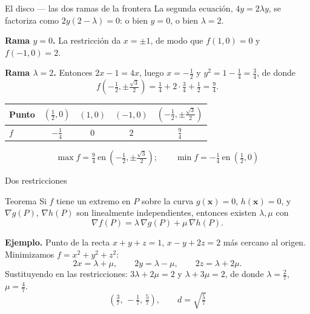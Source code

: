 \documentclass[11pt,aspectratio=169]{beamer}
\begin{document}
\begin{frame}{El disco --- las dos ramas de la frontera}
  La segunda ecuación, $4y=2\lambda y$, se factoriza como $2y(2-\lambda)=0$: o bien $y=0$, o bien $\lambda=2$.
  \par\pause\smallskip
  \textbf{Rama $y=0$.} La restricción da $x=\pm1$, de modo que
  $f(1,0)=0$ y $f(-1,0)=2$.
  \par\pause\smallskip
  \textbf{Rama $\lambda=2$.} Entonces $2x-1=4x$, luego $x=-\tfrac12$ y $y^2=1-\tfrac14=\tfrac34$, de donde
  \[
    f\!\left(-\tfrac12,\pm\tfrac{\sqrt3}{2}\right)=\tfrac14+2\cdot\tfrac34+\tfrac12=\tfrac94.
  \]
  \pause
  \begin{center}\small
  \begin{tabular}{lcccc}
    \toprule
    \textbf{Punto} & $\left(\frac12,0\right)$ & $(1,0)$ & $(-1,0)$ & $\left(-\frac12,\pm\frac{\sqrt3}{2}\right)$ \\
    \midrule
    $f$ & $-\frac14$ & $0$ & $2$ & $\frac94$ \\
    \bottomrule
  \end{tabular}
  \end{center}
  \pause
  \vspace{-4pt}
  \[
    \boxed{\max f=\tfrac94\ \text{en}\ \left(-\tfrac12,\pm\tfrac{\sqrt3}{2}\right);
           \qquad \min f=-\tfrac14\ \text{en}\ \left(\tfrac12,0\right)}
  \]
\end{frame}

\begin{frame}{Dos restricciones}
  \begin{block}{Teorema}
    Si $f$ tiene un extremo en $P$ sobre la curva $g(\mathbf x)=0$, $h(\mathbf x)=0$, y $\nabla g(P)$, $\nabla h(P)$ son linealmente independientes, entonces existen $\lambda,\mu$ con
    \[
      \nabla f(P)=\lambda\,\nabla g(P)+\mu\,\nabla h(P).
    \]
  \end{block}
  \pause
  \textbf{Ejemplo.} Punto de la recta $x+y+z=1$, $x-y+2z=2$ más cercano al origen. Minimizamos $f=x^2+y^2+z^2$:
  \[
    2x=\lambda+\mu,\qquad 2y=\lambda-\mu,\qquad 2z=\lambda+2\mu.
  \]
  \pause
  Sustituyendo en las restricciones: $3\lambda+2\mu=2$ y $\lambda+3\mu=2$, de donde $\lambda=\tfrac27$, $\mu=\tfrac47$.
  \pause
  \[
    \boxed{\left(\tfrac37,\,-\tfrac17,\,\tfrac57\right),\qquad d=\sqrt{\tfrac57}}
  \]
\end{frame}
\end{document}
